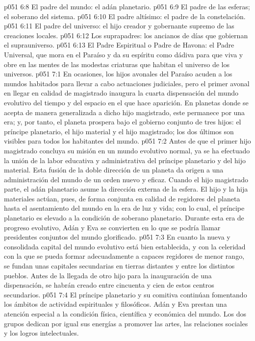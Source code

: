 \vs p051 6:8 El padre del mundo: el adán planetario.
\vs p051 6:9 El padre de las esferas; el soberano del sistema.
\vs p051 6:10 El padre altísimo: el padre de la constelación.
\vs p051 6:11 El padre del universo: el hijo creador y gobernante supremo de las creaciones locales.
\vs p051 6:12 Los suprapadres: los ancianos de días que gobiernan el suprauniverso.
\vs p051 6:13 El Padre Espiritual o Padre de Havona: el Padre Universal, que mora en el Paraíso y da su espíritu como dádiva para que viva y obre en las mentes de las modestas criaturas que habitan el universo de los universos.
\vs p051 7:1 En ocasiones, los hijos avonales del Paraíso acuden a los mundos habitados para llevar a cabo actuaciones judiciales, pero el primer avonal en llegar en calidad de magistrado inaugura la cuarta dispensación del mundo evolutivo del tiempo y del espacio en el que hace aparición. En planetas donde se acepta de manera generalizada a dicho hijo magistrado, este permanece por una era; y, por tanto, el planeta prospera bajo el gobierno conjunto de tres hijos: el príncipe planetario, el hijo material y el hijo magistrado; los dos últimos son visibles para todos los habitantes del mundo.
\vs p051 7:2 Antes de que el primer hijo magistrado concluya su misión en un mundo evolutivo normal, ya se ha efectuado la unión de la labor educativa y administrativa del príncipe planetario y del hijo material. Esta fusión de la doble dirección de un planeta da origen a una administración del mundo de un orden nuevo y eficaz. Cuando el hijo magistrado parte, el adán planetario asume la dirección externa de la esfera. El hijo y la hija materiales actúan, pues, de forma conjunta en calidad de regidores del planeta hasta el asentamiento del mundo en la era de luz y vida; con lo cual, el príncipe planetario es elevado a la condición de soberano planetario. Durante esta era de progreso evolutivo, Adán y Eva se convierten en lo que se podría llamar presidentes conjuntos del mundo glorificado.
\vs p051 7:3 En cuanto la nueva y consolidada capital del mundo evolutivo está bien establecida, y con la celeridad con la que se pueda formar adecuadamente a capaces regidores de menor rango, se fundan unas capitales secundarias en tierras distantes y entre los distintos pueblos. Antes de la llegada de otro hijo para la inauguración de una dispensación, se habrán creado entre cincuenta y cien de estos centros secundarios.
\vs p051 7:4 El príncipe planetario y su comitiva continúan fomentando los ámbitos de actividad espirituales y filosóficos. Adán y Eva prestan una atención especial a la condición física, científica y económica del mundo. Los dos grupos dedican por igual sus energías a promover las artes, las relaciones sociales y los logros intelectuales.
